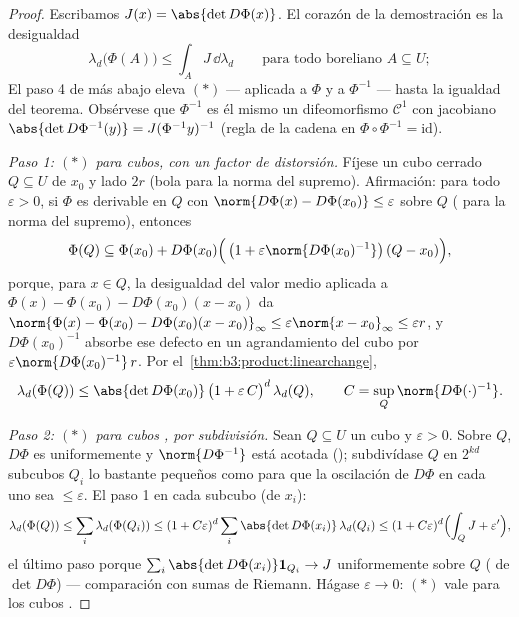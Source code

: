 \begin{proof}
Escribamos $J(x) = \abs{\det D\Phi(x)}$. El corazón de la demostración
es la desigualdad
\[
\lambda_d\bigl(\Phi(A)\bigr) \leq \int_A J\,\dd\lambda_d
\qquad\text{para todo boreliano } A \subseteq U;
\tag{$*$}
\]
El paso 4 de más abajo eleva $(*)$ --- aplicada a $\Phi$ y a $\Phi^{-1}$
--- hasta la igualdad del teorema. Obsérvese que $\Phi^{-1}$ es él mismo
un difeomorfismo $\mathcal C^1$ con jacobiano
$\abs{\det D\Phi^{-1}(y)} = J(\Phi^{-1}y)^{-1}$ (regla de la cadena en
$\Phi\circ\Phi^{-1} = \mathrm{id}$).

\emph{Paso 1: $(*)$ para cubos, con un factor de distorsión.} Fíjese un
cubo cerrado $Q \subseteq U$ de 
$x_0$ y lado $2r$ (bola para la norma del supremo). Afirmación: para
todo $\varepsilon > 0$, si $\Phi$ es derivable en $Q$ con
$\norm{D\Phi(x) - D\Phi(x_0)} \leq \varepsilon$ sobre $Q$
( para la norma del
supremo), entonces
\[
\Phi(Q) \subseteq \Phi(x_0) + D\Phi(x_0)\Bigl(\,\bigl(1 +
\varepsilon\norm{D\Phi(x_0)^{-1}}\bigr)\,(Q - x_0)\Bigr),
\]
porque, para $x \in Q$, la desigualdad del valor medio aplicada a
$\Phi(x) - \Phi(x_0) - D\Phi(x_0)(x - x_0)$ da
$\norm{\Phi(x) - \Phi(x_0) - D\Phi(x_0)(x-x_0)}_\infty \leq
\varepsilon\norm{x - x_0}_\infty \leq \varepsilon r$, y
$D\Phi(x_0)^{-1}$ absorbe ese defecto en un agrandamiento del cubo por
$\varepsilon\norm{D\Phi(x_0)^{-1}}\,r$. Por
el~\cref{thm:b3:product:linearchange},
\[
\lambda_d(\Phi(Q)) \leq \abs{\det D\Phi(x_0)}\,
\bigl(1 + \varepsilon\,C\bigr)^{d}\,\lambda_d(Q),
\qquad C = \sup_{Q}\norm{D\Phi(\cdot)^{-1}} .
\]

\emph{Paso 2: $(*)$ para cubos
, por subdivisión.} Sean $Q
\subseteq U$ un cubo  y
$\varepsilon > 0$. Sobre $Q$, $D\Phi$ es uniformemente
 y $\norm{D\Phi^{-1}}$ está
acotada (); subdivídase $Q$ en $2^{kd}$ subcubos $Q_i$ lo
bastante pequeños como para que la oscilación de $D\Phi$ en cada uno sea
$\leq \varepsilon$. El paso 1 en cada subcubo (de
 $x_i$):
\[
\lambda_d(\Phi(Q)) \leq \sum_i\lambda_d(\Phi(Q_i))
\leq (1 + C\varepsilon)^d \sum_i \abs{\det
D\Phi(x_i)}\,\lambda_d(Q_i)
\leq (1 + C\varepsilon)^d\Bigl(\int_Q J + \varepsilon'\Bigr),
\]
el último paso porque $\sum_i\abs{\det D\Phi(x_i)}\mathbf
1_{Q_i} \to J$ uniformemente sobre $Q$
( de $\det D\Phi$) ---
comparación con sumas de Riemann. Hágase $\varepsilon \to 0$: $(*)$ vale
para los cubos .


\end{proof}
